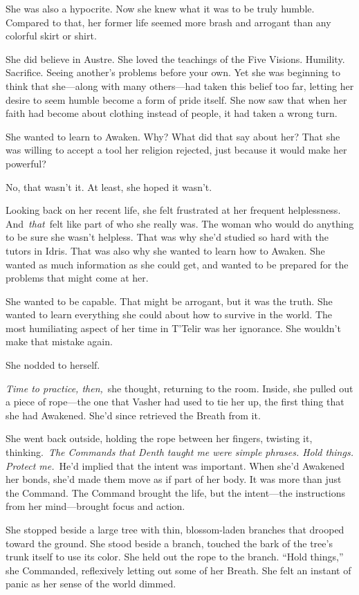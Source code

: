 She was also a hypocrite. Now she knew what it was to be truly humble. Compared to that, her former life seemed more brash and arrogant than any colorful skirt or shirt.

She did believe in Austre. She loved the teachings of the Five Visions. Humility. Sacrifice. Seeing another’s problems before your own. Yet she was beginning to think that she—along with many others—had taken this belief too far, letting her desire to seem humble become a form of pride itself. She now saw that when her faith had become about clothing instead of people, it had taken a wrong turn.

She wanted to learn to Awaken. Why? What did that say about her? That she was willing to accept a tool her religion rejected, just because it would make her powerful?

No, that wasn’t it. At least, she hoped it wasn’t.

Looking back on her recent life, she felt frustrated at her frequent helplessness. And~\textit{that}~felt like part of who she really was. The woman who would do anything to be sure she wasn’t helpless. That was why she’d studied so hard with the tutors in Idris. That was also why she wanted to learn how to Awaken. She wanted as much information as she could get, and wanted to be prepared for the problems that might come at her.

She wanted to be capable. That might be arrogant, but it was the truth. She wanted to learn everything she could about how to survive in the world. The most humiliating aspect of her time in T’Telir was her ignorance. She wouldn’t make that mistake again.

She nodded to herself.

\textit{Time to practice, then,}~she thought, returning to the room. Inside, she pulled out a piece of rope—the one that Vasher had used to tie her up, the first thing that she had Awakened. She’d since retrieved the Breath from it.

She went back outside, holding the rope between her fingers, twisting it, thinking.~\textit{The Commands that Denth taught me were simple phrases. Hold things. Protect me.}~He’d implied that the intent was important. When she’d Awakened her bonds, she’d made them move as if part of her body. It was more than just the Command. The Command brought the life, but the intent—the instructions from her mind—brought focus and action.

She stopped beside a large tree with thin, blossom-laden branches that drooped toward the ground. She stood beside a branch, touched the bark of the tree’s trunk itself to use its color. She held out the rope to the branch. “Hold things,” she Commanded, reflexively letting out some of her Breath. She felt an instant of panic as her sense of the world dimmed.

